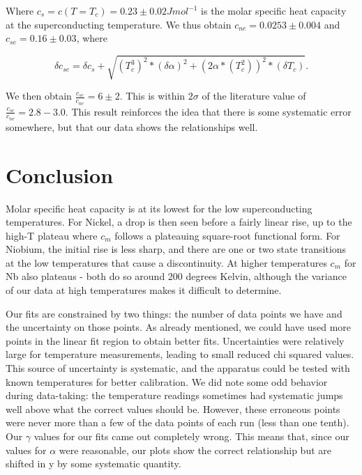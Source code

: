 \documentclass{article}
\begin{document}
Where $c_s = c(T = T_c) = 0.23 \pm 0.02 J mol^{-1}$ is the molar specific heat capacity at the superconducting temperature. We thus obtain $c_{ne} = 0.0253 \pm 0.004$ and $c_{se} = 0.16 \pm 0.03$, where 

\begin{equation}
	\delta c_{se} = \delta c_s + \sqrt{(T_c^3)^2*(\delta \alpha)^2 + (2\alpha*(T_c^2))^2*(\delta T_c)}.
\end {equation}

We then obtain $\frac{c_{se}}{c_{ne}} = 6 \pm 2$. This is within $2\sigma$ of the literature value of $\frac{c_{se}}{c_{ne}}=2.8-3.0$. This result reinforces the idea that there is some systematic error somewhere, but that our data shows the relationships well.

\section{Conclusion}

Molar specific heat capacity is at its lowest for the low superconducting temperatures. For Nickel, a drop is then seen before a fairly linear rise, up to the high-T plateau where $c_m$ follows a plateauing square-root functional form. For Niobium, the initial rise is less sharp, and there are one or two state transitions at the low temperatures that cause a discontinuity. At higher temperatures $c_m$ for Nb also plateaus - both do so around 200 degrees Kelvin, although the variance of our data at high temperatures makes it difficult to determine.

\hspace{.25cm}

Our fits are constrained by two things: the number of data points we have and the uncertainty on those points. As already mentioned, we could have used more points in the linear fit region to obtain better fits. Uncertainties were relatively large for temperature measurements, leading to small reduced chi squared values. This source of uncertainty is systematic, and the apparatus could be tested with known temperatures for better calibration. We did note some odd behavior during data-taking: the temperature readings sometimes had systematic jumps well above what the correct values should be. However, these erroneous points were never more than a few of the data points of each run (less than one tenth). Our $\gamma$ values for our fits came out completely wrong. This means that, since our values for $\alpha$ were reasonable, our plots show the correct relationship but are shifted in y by some systematic quantity.
\end{document}
